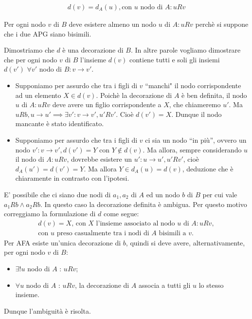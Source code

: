\begin{proof2}
\begin{enumerate}
\begin{gather*}
                  d(v) = d_A(u), \text{con $u$ nodo di $A$} : u R v
              \end{gather*}
              \begin{nonobservation}
                  Per ogni nodo $v$ di $B$ deve esistere almeno un nodo $u$ di $A : u R v$ perchè si suppone che i due APG siano bisimili.
              \end{nonobservation}
              Dimostriamo che $d$ è una decorazione di $B$. In altre parole vogliamo dimostrare che per ogni nodo $v$ di $B$ l'insieme $d(v)$ contiene tutti e soli gli
              insiemi $d(v') \,\,\forall v'$ nodo di $B : v \to v'$.
              \begin{itemize}
                  \item Supponiamo per assurdo che tra i figli di $v$ ``manchi" il nodo corrispondente ad un elemento $X \in d(v)$. Poichè la decorazione di $A$ è ben definita,
                        il nodo $u$ di $A : u R v$ deve avere un figlio corrispondente a $X$, che chiameremo $u'$. Ma $u R b, u \to u' \implies \exists v' : v \to v', u' R v'$.
                        Cioè $d(v') = X$. Dunque il nodo mancante è stato identificato.
                  \item Supponiamo per assurdo che tra i figli di $v$ ci sia un nodo ``in più'', ovvero un nodo $v' : v \to v', d(v') = Y$ con $Y \notin d(v)$. Ma
                        allora, sempre considerando $u$ il nodo di $A : u R v$, dovrebbe esistere un $u' : u \to u', u' R v'$, cioè $d_A(u') = d(v') = Y$.
                        Ma allora $Y \in d_A(u) = d(v)$, deduzione che è chiaramente in contrasto con l'ipotesi.
              \end{itemize}
              E' possibile che ci siano due nodi di $a_1, a_2$ di $A$ ed un nodo $b$ di $B$ per cui vale $a_1 R b \land a_2 R b$. In questo caso la decorazione definita è ambigua.
              Per questo motivo correggiamo la formulazione di $d$ come segue:
              \begin{gather*}
                d(v) = X \text{, con $X$ l'insieme associato al nodo $u$ di $A$} : u R v, \\
                \text{con $u$ preso casualmente tra i nodi di $A$ bisimili a $v$.}
              \end{gather*}
              Per AFA esiste un'unica decorazione di $b$, quindi si deve avere, alternativamente, per ogni nodo $v$ di $B$:
              \begin{itemize}
                  \item $\exists ! u$ nodo di $A$ : $u R v$;
                  \item $\forall u$ nodo di $A$ : $u R v$, la decorazione di $A$ associa a tutti gli $u$ lo stesso insieme.
              \end{itemize}
              Dunque l'ambiguità è risolta.
    \end{enumerate}
\end{proof2}

